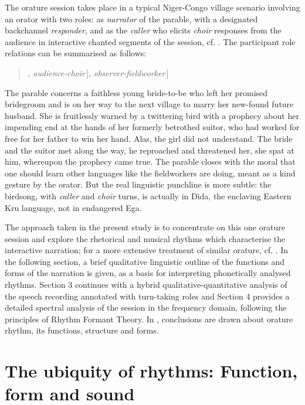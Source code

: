 \documentclass[output=paper,colorlinks,citecolor=brown]{langscibook}
\begin{document}
The orature session takes place in a typical Niger-Congo village scenario involving an orator with two roles: as \textit{narrator} of the parable, with a designated backchannel \textit{responder}, and as the \textit{caller} who elicits \textit{choir} responses from the audience in interactive chanted segments of the session, cf. . The participant role relations can be summarised as follows:
\begin{quotation}
\centering
[\,[\,[\textit{narrator-caller}, \textit{responder}\,], \textit{audience-choir}\,], \textit{observer-fieldworker}\,]
\end{quotation}
The parable concerns a faithless young bride-to-be who left her promised bridegroom and is on her way to the next village to marry her new-found future husband. She is fruitlessly warned by a twittering bird with a prophecy about her impending end at the hands of her formerly betrothed suitor, who had worked for free for her father to win her hand. Alas, the girl did not understand. The bride and the suitor met along the way, he reproached and threatened her, she spat at him, whereupon the prophecy came true. The parable closes with the moral that one should learn other languages like the fieldworkers are doing, meant as a kind gesture by the orator. But the real linguistic punchline is more subtle: the birdsong, with \textit{caller} and \textit{choir} turns, is actually in Dida, the enclaving Eastern Kru language, not in endangered Ega.

The approach taken in the present study is to concentrate on this one orature session and explore the rhetorical and musical rhythms which characterise the interactive narration; for a more extensive treatment of similar orature, cf. . In the following section, a brief qualitative linguistic outline of the functions and forms of the narration is given, as a basis for interpreting phonetically analysed rhythms. Section 3 continues with a hybrid qualitative-quantitative analysis of the speech recording annotated with turn-taking roles and Section 4 provides a detailed spectral analysis of the session in the frequency domain, following the principles of Rhythm Formant Theory. In , conclusions are drawn about orature rhythm, its functions, structure and forms.


\section{The ubiquity of rhythms: Function, form and sound}\label{sec:gibbon:2}
\end{document}
